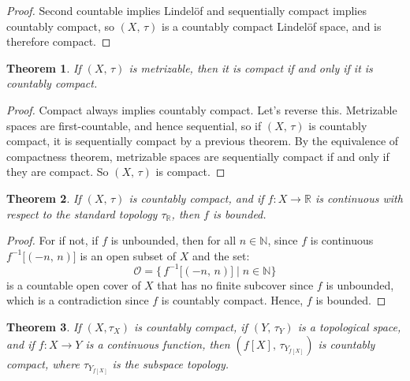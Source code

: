 \documentclass{article}
\theoremstyle{plain}
\newtheorem{theorem}{Theorem}[section]
\theoremstyle{normal}
\begin{document}
        \begin{proof}
            Second countable implies Lindel\"{o}f and sequentially compact
            implies countably compact, so $(X,\,\tau)$ is a countably compact
            Lindel\"{o}f space, and is therefore compact.
        \end{proof}
        \begin{theorem}
            If $(X,\,\tau)$ is metrizable, then it is compact if and only if
            it is countably compact.
        \end{theorem}
        \begin{proof}
            Compact always implies countably compact. Let's reverse this.
            Metrizable spaces are first-countable, and hence sequential,
            so if $(X,\,\tau)$ is countably compact, it is sequentially
            compact by a previous theorem. By the equivalence of compactness
            theorem, metrizable spaces are sequentially compact if and only
            if they are compact. So $(X,\,\tau)$ is compact.
        \end{proof}
        \begin{theorem}
            If $(X,\,\tau)$ is countably compact,
            and if $f:X\rightarrow\mathbb{R}$ is
            continuous with respect to the standard topology
            $\tau_{\mathbb{R}}$, then $f$ is bounded.
        \end{theorem}
        \begin{proof}
            For if not, if $f$ is unbounded, then for all $n\in\mathbb{N}$,
            since $f$ is continuous
            $f^{-1}\big[(-n,\,n)]$ is an open subset of $X$ and the set:
            \begin{equation}
                \mathcal{O}=\Big\{\,f^{-1}\big[(-n,\,n)\big]\;|\;n\in\mathbb{N}
                    \Big\}
            \end{equation}
            is a countable open cover of $X$ that has no finite subcover since
            $f$ is unbounded, which is a contradiction since $f$ is
            countably compact. Hence, $f$ is bounded.
        \end{proof}
        \begin{theorem}
            If $(X,\tau_{X})$ is countably compact, if $(Y,\,\tau_{Y})$ is a
            topological space, and if $f:X\rightarrow{Y}$ is a continuous
            function, then $(f[X],\,\tau_{Y_{f[X]}})$ is countably compact,
            where $\tau_{Y_{f[X]}}$ is the subspace topology.
        \end{theorem}
\end{document}
